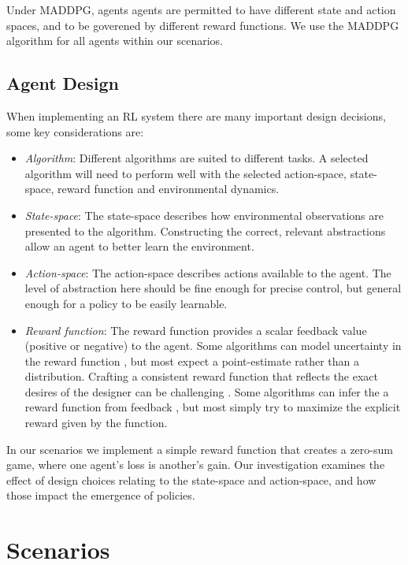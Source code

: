 \documentclass[11pt,a4paper]{article}
\begin{document}
Under MADDPG, agents agents are permitted to have different state and action spaces, and to be goverened by different reward functions.
We use the MADDPG algorithm for all agents within our scenarios.

\subsection{Agent Design}

When implementing an RL system there are many important design decisions, some key considerations are:

\begin{itemize}
  \item \emph{Algorithm}: Different algorithms are suited to different tasks. A selected algorithm will need to perform well with the selected action-space, state-space, reward function and environmental dynamics.
  \item \emph{State-space}: The state-space describes how environmental observations are presented to the algorithm. Constructing the correct, relevant abstractions allow an agent to better learn the environment.
  \item \emph{Action-space}: The action-space describes actions available to the agent. The level of abstraction here should be fine enough for precise control, but general enough for a policy to be easily learnable.
  \item \emph{Reward function}: The reward function provides a scalar feedback value (positive or negative) to the agent. Some algorithms can model uncertainty in the reward function \citep{ghavamzadeh2016bayesian}, but most expect a point-estimate rather than a distribution. Crafting a consistent reward function that reflects the exact desires of the designer can be challenging \citep{leike2017ai}. Some algorithms can infer the a reward function from feedback \citep{ng2000algorithms}, but most simply try to maximize the explicit reward given by the function.
\end{itemize}

In our scenarios we implement a simple reward function that creates a zero-sum game, where one agent's loss is another's gain.
Our investigation examines the effect of design choices relating to the state-space and action-space, and how those impact the emergence of policies.

\section{Scenarios}
\label{sec:scenarios}
\end{document}
